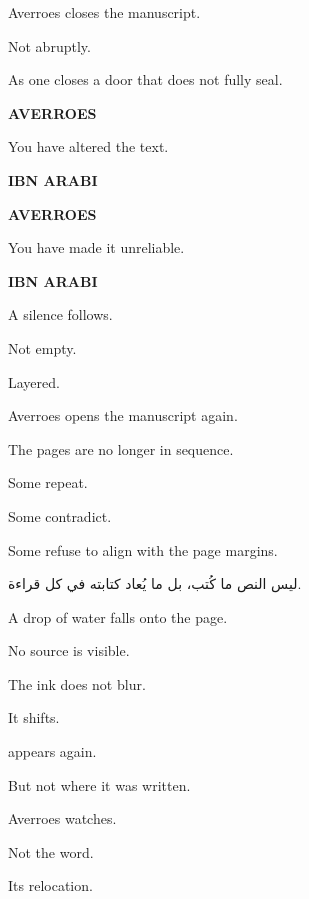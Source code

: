 \medskip

Averroes closes the manuscript.

Not abruptly.

As one closes a door that does not fully seal.

\medskip

\textbf{AVERROES}

You have altered the text.

\medskip

\textbf{IBN ARABI}


\medskip

\textbf{AVERROES}

You have made it unreliable.

\medskip

\textbf{IBN ARABI}


\medskip

A silence follows.

Not empty.

Layered.

\medskip

Averroes opens the manuscript again.

The pages are no longer in sequence.

Some repeat.

Some contradict.

Some refuse to align with the page margins.

\medskip

\begin{AR}
ليس النص ما كُتب، بل ما يُعاد كتابته في كل قراءة.
\end{AR}

\medskip

A drop of water falls onto the page.

No source is visible.

The ink does not blur.

It shifts.

\medskip

 appears again.

But not where it was written.

\medskip

Averroes watches.

Not the word.

Its relocation.

\medskip

